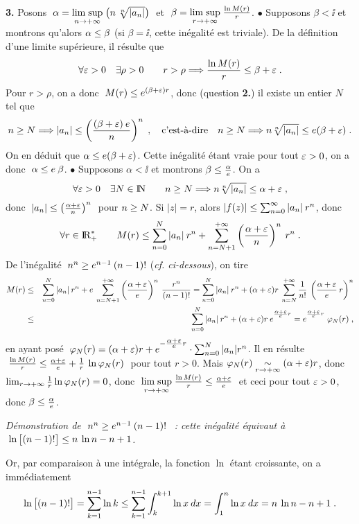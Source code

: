 \documentclass{article}
\begin{document}
{\bf 3.} Posons $\;\alpha=\limsup{n}{\ii}\big(n\>\root n\of{|a_n|}\big)\;$ et $\;\beta=\limsup{r}{\ii}{\ln M(r)\s r}$.
\msk\sect
$\bullet$ Supposons $\beta<\ii$ et montrons qu'alors $\alpha\leq\beta$ (si $\beta=\ii$, cette in\'egalit\'e est triviale). De la d\'efinition d'une limite sup\'erieure, il r\'esulte que\vv
$$\forall\varepsilon>0\quad\exists\rho>0\qquad r>\rho\Longrightarrow{\ln M(r)\over r}\leq\beta+\varepsilon\;.$$
Pour $r>\rho$, on a donc $\;M(r)\leq e^{(\beta+\varepsilon)r}$, donc (question {\bf 2.}) il existe un entier $N$ tel que\vv
$$n\se N\impl|a_n|\ie\lp{(\beta+\eps)\>e\s n}\rp^n\;,\quad\hbox{c'est-\`a-dire}\quad n\se N\impl n\root n\of{|a_n|}\ie e(\beta+\eps)\;.$$
On en d\'eduit que $\alpha\leq e(\beta+\varepsilon)$. Cette in\'egalit\'e \'etant vraie pour tout $\varepsilon>0$, on a donc $\;\alpha\leq e\>\beta$.
\msk\sect
$\bullet$ Supposons $\alpha<\ii$ et montrons $\beta\leq{\alpha\over e}$. On a\vv
$$\a \eps>0\quad\e N\in\nmat\qquad n\se N\impl n\root n\of{|a_n|}\ie\alpha+\eps\;,$$
donc $\;|a_n|\leq\left({\alpha+\varepsilon\over n}\right)^n\;$ pour $n\geq N$.\ssk\new
Si $|z|=r$, alors $|f(z)|\leq\sum_{n=0}^{\infty}|a_n|\>r^n$, donc\vv
$$\forall r\in{\rm I\kern-0.6mm R}_+^*\qquad M(r)\leq\sum_{n=0}^N|a_n|\>r^n+\sum_{n=N+1}^{+\infty}\left({\alpha+\varepsilon\over n}\right)^n\>r^n\;.$$
De l'in\'egalit\'e $\;n^n\geq e^{n-1}\>(n-1)!$ ({\it cf. ci-dessous}), on tire\vv
\begin{eqnarray*}
M(r) & \ie & \sum_{n=0}^N|a_n|\>r^n+e\>\sum_{n=N+1}^{\ii}\lp{\alpha+\eps\s e}\rp^n\>{r^n\s(n-1)!}
= \sum_{n=0}^N|a_n|\>r^n+(\alpha+\eps)r\>\sum_{n=N}^{\ii}{1\s n!}\>\lp{\alpha+\eps\s e}\>r\rp^n\\
& \ie & \sum_{n=0}^N|a_n|\>r^n+(\alpha+\eps)r\>e^{{}^{{\sst\alpha+\eps\sur\sst e}\sst r}}
= e^{{}^{{\sst\alpha+\eps\sur\sst e}\sst r}}\;\ffi_N(r)\;,
\end{eqnarray*}
en ayant pos\'e $\;\ffi_N(r)=(\alpha+\eps)r+e^{{}^{\sst -{\sst\alpha+\eps\sur\sst e}\sst r}}\cdot\sum_{n=0}^N|a_n|r^n$.\msk\new
Il en r\'esulte $\;{\ln M(r)\over r}\leq{\alpha+\varepsilon\over e}+{1\over r}\>\ln\varphi_N(r)\;$ pour tout $r>0$. Mais $\ffi_N(r)\Equi{r}{\ii}(\alpha+\eps)r$, donc $\lim_{r\rightarrow+\infty}{1\over r}\ln\varphi_N(r)=0$, donc $\limsup{r}{\ii}{\ln M(r)\s r}\ie{\alpha+\eps\s e}\;$ et ceci pour tout $\varepsilon>0$, donc $\beta\leq{\alpha\over e}$.

\bsk
{\it D\'emonstration de $\;n^n\geq e^{n-1}\>(n-1)!\;$~: cette in\'egalit\'e \'equivaut \`a $\;\ln\big[(n-1)!\big]\leq n\>\ln n-n+1$.\par Or, par comparaison \`a une int\'egrale, la fonction $\ln$ \'etant croissante, on a imm\'ediatement\vv
$$\ln\big[(n-1)!\big]=\sum_{k=1}^{n-1}\ln k\leq\sum_{k=1}^{n-1}\int_k^{k+1}\ln x\>dx=\int_1^n\ln x\>dx=n\>\ln n-n+1\;.$$}
\end{document}
